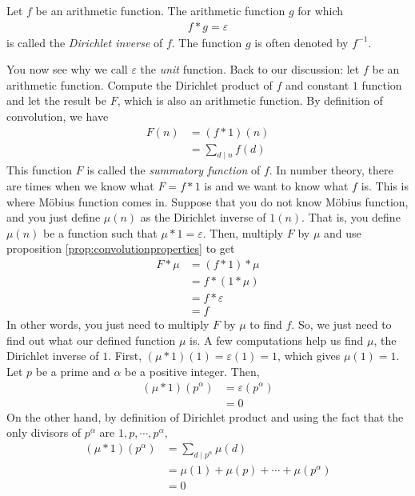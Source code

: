 	\begin{definition}
		Let $f$ be an arithmetic function. The arithmetic function $g$ for which
			\begin{align*}
				f \ast g = \varepsilon
			\end{align*}
		is called the \textit{Dirichlet inverse} of $f$. The function $g$ is often denoted by $f^{-1}$.
	\end{definition}
You now see why we call $\varepsilon$ the \textit{unit} function. Back to our discussion: let $f$ be an arithmetic function. Compute the Dirichlet product of $f$ and constant $1$ function and let the result be $F$, which is also an arithmetic function. By definition of convolution, we have
	\begin{align*}
		F(n) &= (f\ast 1)(n)\\
    &= \sum_{d\mid n} f(d)
	\end{align*}
This function $F$ is called the \textit{summatory function} of $f$. In number theory, there are times when we know what $F=f\ast 1$ is and we want to know what $f$ is. This is where M\"{o}bius function comes in. Suppose that you do not know M\"{o}bius function, and you just define $\mu(n)$ as the Dirichlet inverse of $1(n)$. That is, you define $\mu(n)$ be a function such that $\mu \ast 1 = \varepsilon$. Then, multiply $F$ by $\mu$ and use proposition \ref{prop:convolutionproperties} to get
	\begin{align*}
		F \ast \mu &= (f \ast 1) \ast \mu\\
	   &= f \ast (1 \ast \mu)\\
	   &= f \ast \varepsilon\\
	   &=f
	\end{align*}
In other words, you just need to multiply $F$ by $\mu$ to find $f$. So, we just need to find out what our defined function $\mu$ is. A few computations help us find $\mu$, the Dirichlet inverse of $1$. First, $(\mu \ast 1)(1)=\varepsilon(1)=1$, which gives $\mu(1)=1$. Let $p$ be a prime and $\alpha$ be a positive integer. Then,
	\begin{align*}
		(\mu \ast 1)(p^\alpha) &= \varepsilon(p^\alpha)\\
			   &= 0
	\end{align*}
On the other hand, by definition of Dirichlet product and using the fact that the only divisors of $p^\alpha$ are $1,p,\cdots,p^\alpha$,
	\begin{align*}
		(\mu \ast 1)(p^\alpha) &= \sum_{d\mid p^\alpha}\mu(d)\\
			   &= \mu(1) + \mu(p) + \cdots + \mu(p^\alpha)\\
			   &= 0
	\end{align*}
